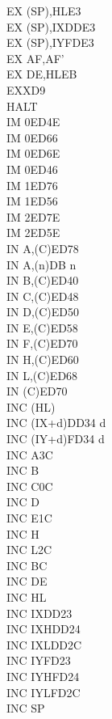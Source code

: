\begin{multicols}{3}
{\begin{tabbing}
		EX (SP),HL\>E3\\
		EX (SP),IX\>DDE3\\
		EX (SP),IY\>FDE3\\
		EX AF,AF'\\
		EX DE,HL\>EB\\
		EXX\>D9\\
		HALT\\
		IM 0\UNDOC\>ED4E\\
		IM 0\UNDOC\>ED66\\
		IM 0\UNDOC\>ED6E\\
		IM 0\>ED46\\
		IM 1\UNDOC\>ED76\\
		IM 1\>ED56\\
		IM 2\UNDOC\>ED7E\\
		IM 2\>ED5E\\
		IN A,(C)\>ED78\\
		IN A,(n)\>DB n\\
		IN B,(C)\>ED40\\
		IN C,(C)\>ED48\\
		IN D,(C)\>ED50\\
		IN E,(C)\>ED58\\
		IN F,(C)\UNDOC\>ED70\\
		IN H,(C)\>ED60\\
		IN L,(C)\>ED68\\
		IN (C)\UNDOC\>ED70\\
		INC (HL)\\
		INC (IX+d)\>DD34 d\\
		INC (IY+d)\>FD34 d\\
		INC A\>3C\\
		INC B\\
		INC C\>0C\\
		INC D\\
		INC E\>1C\\
		INC H\\
		INC L\>2C\\
		INC BC\\
		INC DE\\
		INC HL\\
		INC IX\>DD23\\
		INC IXH\UNDOC\>DD24\\
		INC IXL\UNDOC\>DD2C\\
		INC IY\>FD23\\
		INC IYH\UNDOC\>FD24\\
		INC IYL\UNDOC\>FD2C\\
		INC SP\\

\end{tabbing}}
\end{multicols}
